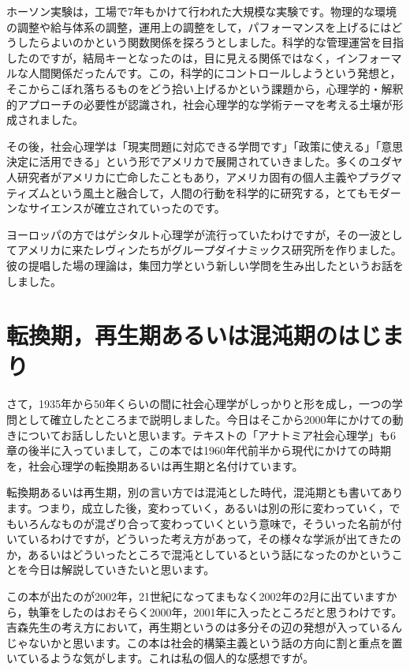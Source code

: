 \documentclass{ltjsbook}
\begin{document}
ホーソン実験は，工場で7年もかけて行われた大規模な実験です。物理的な環境の調整や給与体系の調整，運用上の調整をして，パフォーマンスを上げるにはどうしたらよいのかという関数関係を探ろうとしました。科学的な管理運営を目指したのですが，結局キーとなったのは，目に見える関係ではなく，インフォーマルな人間関係だったんです。この，科学的にコントロールしようという発想と，そこからこぼれ落ちるものをどう拾い上げるかという課題から，心理学的・解釈的アプローチの必要性が認識され，社会心理学的な学術テーマを考える土壌が形成されました。

その後，社会心理学は「現実問題に対応できる学問です」「政策に使える」「意思決定に活用できる」という形でアメリカで展開されていきました。多くのユダヤ人研究者がアメリカに亡命したこともあり，アメリカ固有の個人主義やプラグマティズムという風土と融合して，人間の行動を科学的に研究する，とてもモダーンなサイエンスが確立されていったのです。

ヨーロッパの方ではゲシタルト心理学が流行っていたわけですが，その一波としてアメリカに来たレヴィンたちがグループダイナミックス研究所を作りました。彼の提唱した場の理論は，集団力学という新しい学問を生み出したというお話をしました。

\section{転換期，再生期あるいは混沌期のはじまり}

さて，1935年から50年くらいの間に社会心理学がしっかりと形を成し，一つの学問として確立したところまで説明しました。今日はそこから2000年にかけての動きについてお話ししたいと思います。テキスト\parencite{anatomia}の「アナトミア社会心理学」も6章の後半に入っていまして，この本では1960年代前半から現代にかけての時期を，社会心理学の転換期あるいは再生期と名付けています。

転換期あるいは再生期，別の言い方では混沌とした時代，混沌期とも書いてあります。つまり，成立した後，変わっていく，あるいは別の形に変わっていく，でもいろんなものが混ざり合って変わっていくという意味で，そういった名前が付いているわけですが，どういった考え方があって，その様々な学派が出てきたのか，あるいはどういったところで混沌としているという話になったのかということを今日は解説していきたいと思います。

この本が出たのが2002年，21世紀になってまもなく2002年の2月に出ていますから，執筆をしたのはおそらく2000年，2001年に入ったところだと思うわけです。吉森先生の考え方において，再生期というのは多分その辺の発想が入っているんじゃないかと思います。この本は社会的構築主義という話の方向に割と重点を置いているような気がします。これは私の個人的な感想ですが。
\end{document}
